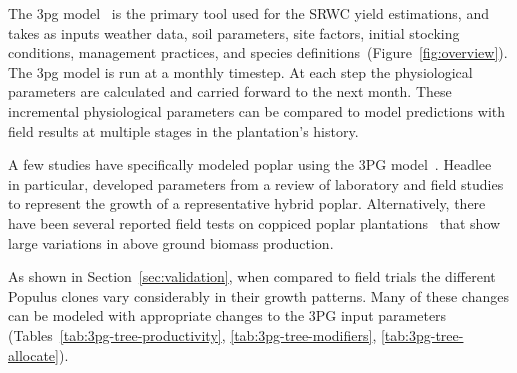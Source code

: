 \documentclass[preprint,12pt]{elsarticle}
\begin{document}
The \acf{3pg} model~\cite{Landsberg1997, landsberg2010physiological,
  Sands2004} is the primary tool used for the \ac{SRWC} yield
estimations, and takes as inputs weather data, soil parameters, site
factors, initial stocking conditions, management practices, and
species definitions~(Figure~\ref{fig:overview}).  The \ac{3pg} model
is run at a monthly timestep. At each step the physiological
parameters are calculated and carried forward to the next
month. 
These incremental physiological parameters
can be compared to model predictions with field results at multiple
stages in the plantation's history.

A few studies have specifically modeled poplar using the 3PG
model~\cite{Amichev2010,Headlee2012}. Headlee~\cite{Headlee2012} in
particular, developed parameters from a review of laboratory and field
studies to represent the growth of a representative hybrid poplar.
Alternatively, there have been several reported field tests on
coppiced poplar
plantations~\cite{Proe2002,Proe1999,Pontailler1999,Afas2008a} that
show large variations in above ground biomass production.

As shown in
Section~\ref{sec:validation}, when compared to field trials the different
Populus clones vary considerably in their growth patterns. Many of these changes
can be modeled with appropriate changes to the 3PG input parameters
(Tables~\ref{tab:3pg-tree-productivity}, \ref{tab:3pg-tree-modifiers},
\ref{tab:3pg-tree-allocate}).

\end{document}
